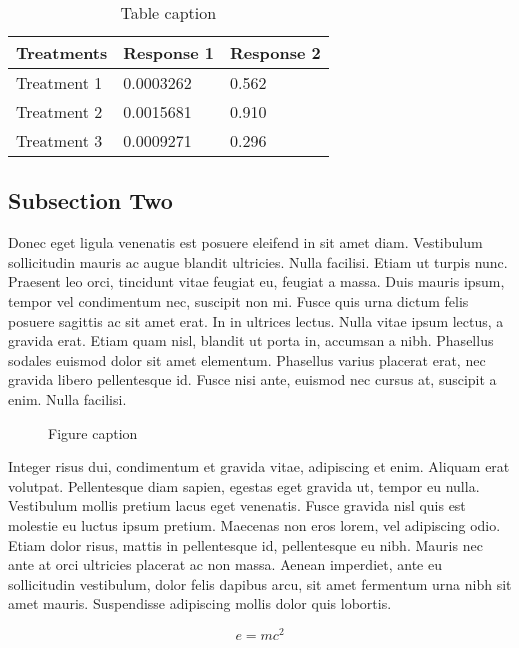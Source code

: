 \documentclass[preprint,12pt]{elsarticle}
\begin{document}
	\begin{table}[h]
		\centering
		\begin{tabular}{l l l}
			\hline
			\textbf{Treatments} & \textbf{Response 1} & \textbf{Response 2}\\
			\hline
			Treatment 1 & 0.0003262 & 0.562 \\
			Treatment 2 & 0.0015681 & 0.910 \\
			Treatment 3 & 0.0009271 & 0.296 \\
			\hline
		\end{tabular}
		\caption{Table caption}
	\end{table}
	
	\subsection{Subsection Two}
	
	Donec eget ligula venenatis est posuere eleifend in sit amet diam. Vestibulum sollicitudin mauris ac augue blandit ultricies. Nulla facilisi. Etiam ut turpis nunc. Praesent leo orci, tincidunt vitae feugiat eu, feugiat a massa. Duis mauris ipsum, tempor vel condimentum nec, suscipit non mi. Fusce quis urna dictum felis posuere sagittis ac sit amet erat. In in ultrices lectus. Nulla vitae ipsum lectus, a gravida erat. Etiam quam nisl, blandit ut porta in, accumsan a nibh. Phasellus sodales euismod dolor sit amet elementum. Phasellus varius placerat erat, nec gravida libero pellentesque id. Fusce nisi ante, euismod nec cursus at, suscipit a enim. Nulla facilisi.
	
	\begin{figure}[h]
		
		\caption{Figure caption}
	\end{figure}
	
	Integer risus dui, condimentum et gravida vitae, adipiscing et enim. Aliquam erat volutpat. Pellentesque diam sapien, egestas eget gravida ut, tempor eu nulla. Vestibulum mollis pretium lacus eget venenatis. Fusce gravida nisl quis est molestie eu luctus ipsum pretium. Maecenas non eros lorem, vel adipiscing odio. Etiam dolor risus, mattis in pellentesque id, pellentesque eu nibh. Mauris nec ante at orci ultricies placerat ac non massa. Aenean imperdiet, ante eu sollicitudin vestibulum, dolor felis dapibus arcu, sit amet fermentum urna nibh sit amet mauris. Suspendisse adipiscing mollis dolor quis lobortis.
	
	\begin{equation}
	\label{eq:emc}
	e = mc^2
	\end{equation}
	
\end{document}
